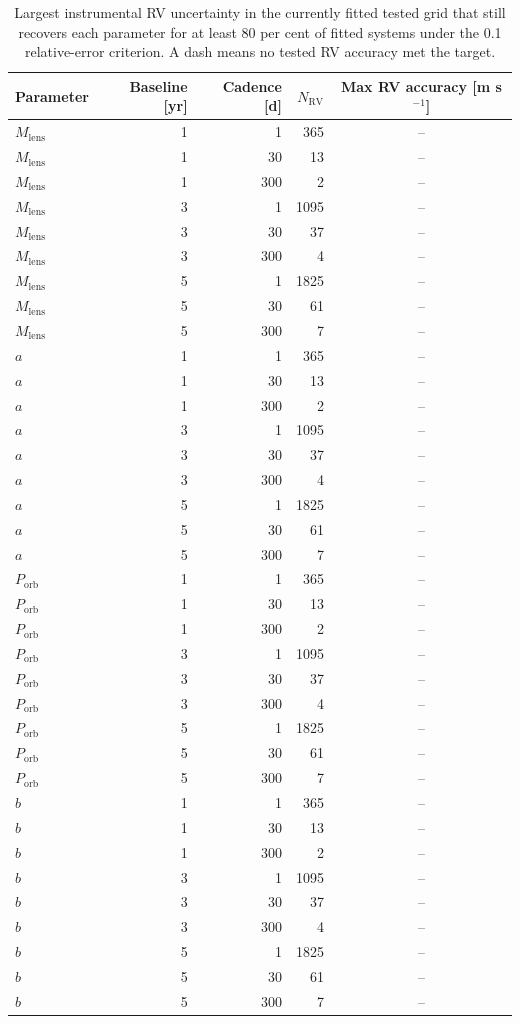 \begin{table}
\centering
\small
\caption{Largest instrumental RV uncertainty in the currently fitted tested grid that still recovers each parameter for at least 80 per cent of fitted systems under the 0.1 relative-error criterion. A dash means no tested RV accuracy met the target.}
\label{tab:rv-accuracy-requirements}
\begin{tabular}{lrrrc}
\hline
Parameter & Baseline [yr] & Cadence [d] & $N_\mathrm{RV}$ & Max RV accuracy [m s$^{-1}$] \\
\hline
$M_\mathrm{lens}$ & 1 & 1 & 365 & -- \\
$M_\mathrm{lens}$ & 1 & 30 & 13 & -- \\
$M_\mathrm{lens}$ & 1 & 300 & 2 & -- \\
$M_\mathrm{lens}$ & 3 & 1 & 1095 & -- \\
$M_\mathrm{lens}$ & 3 & 30 & 37 & -- \\
$M_\mathrm{lens}$ & 3 & 300 & 4 & -- \\
$M_\mathrm{lens}$ & 5 & 1 & 1825 & -- \\
$M_\mathrm{lens}$ & 5 & 30 & 61 & -- \\
$M_\mathrm{lens}$ & 5 & 300 & 7 & -- \\
$a$ & 1 & 1 & 365 & -- \\
$a$ & 1 & 30 & 13 & -- \\
$a$ & 1 & 300 & 2 & -- \\
$a$ & 3 & 1 & 1095 & -- \\
$a$ & 3 & 30 & 37 & -- \\
$a$ & 3 & 300 & 4 & -- \\
$a$ & 5 & 1 & 1825 & -- \\
$a$ & 5 & 30 & 61 & -- \\
$a$ & 5 & 300 & 7 & -- \\
$P_\mathrm{orb}$ & 1 & 1 & 365 & -- \\
$P_\mathrm{orb}$ & 1 & 30 & 13 & -- \\
$P_\mathrm{orb}$ & 1 & 300 & 2 & -- \\
$P_\mathrm{orb}$ & 3 & 1 & 1095 & -- \\
$P_\mathrm{orb}$ & 3 & 30 & 37 & -- \\
$P_\mathrm{orb}$ & 3 & 300 & 4 & -- \\
$P_\mathrm{orb}$ & 5 & 1 & 1825 & -- \\
$P_\mathrm{orb}$ & 5 & 30 & 61 & -- \\
$P_\mathrm{orb}$ & 5 & 300 & 7 & -- \\
$b$ & 1 & 1 & 365 & -- \\
$b$ & 1 & 30 & 13 & -- \\
$b$ & 1 & 300 & 2 & -- \\
$b$ & 3 & 1 & 1095 & -- \\
$b$ & 3 & 30 & 37 & -- \\
$b$ & 3 & 300 & 4 & -- \\
$b$ & 5 & 1 & 1825 & -- \\
$b$ & 5 & 30 & 61 & -- \\
$b$ & 5 & 300 & 7 & -- \\
\hline
\end{tabular}
\end{table}
